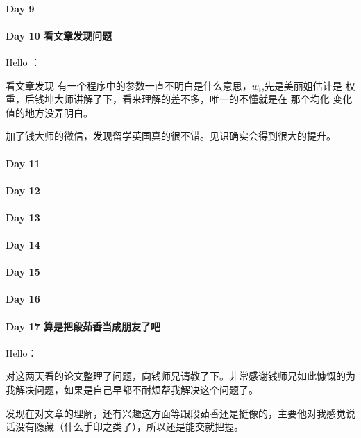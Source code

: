 \documentclass[UTF8,a4paper,8pt]{ctexbook}
\begin{document}
 	 \paragraph{Day 9       \quad     }
 	 \paragraph{Day 10  看文章发现问题    \quad     }
	 	 Hello ：
	 	 
	 	 看文章发现 有一个程序中的参数一直不明白是什么意思，$w_i$,先是美丽姐估计是 权重，后钱坤大师讲解了下，看来理解的差不多，唯一的不懂就是在 那个均化 变化值的地方没弄明白。
	 	 
	 	 加了钱大师的微信，发现留学英国真的很不错。见识确实会得到很大的提升。
	 	 
 	 \paragraph{Day 11      \quad     }
 	 \paragraph{Day 12      \quad     }
 	 \paragraph{Day 13      \quad     }
 	 \paragraph{Day 14      \quad     }
 	 \paragraph{Day 15      \quad     }
 	 \paragraph{Day 16      \quad     }
 	 \paragraph{Day 17   算是把段茹香当成朋友了吧   \quad     }Hello：
 	 
 	 对这两天看的论文整理了问题，向钱师兄请教了下。非常感谢钱师兄如此慷慨的为我解决问题，如果是自己早都不耐烦帮我解决这个问题了。
 	 
 	 发现在对文章的理解，还有兴趣这方面等跟段茹香还是挺像的，主要他对我感觉说话没有隐藏（什么手印之类了），所以还是能交就把握。
 	 
\end{document}
